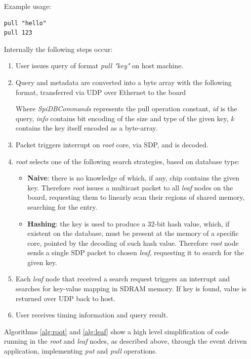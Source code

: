 Example usage:
\begin{lstlisting}
pull "hello"
pull 123
\end{lstlisting}

Internally the following steps occur:
\begin{enumerate}
\item User issues query of format \textit{pull "key"} on host machine.
\item Query and metadata are converted into a byte array with the following format, transferred via UDP over Ethernet to the board %

Where \textit{SpiDBCommands} represents the pull operation constant, \textit{id} is the query, \textit{info} contains bit encoding of the size and type of the given key, \textit{k} contains the key itself encoded as a byte-array.
\item Packet triggers interrupt on \textit{root} core, via SDP, and is decoded.
\item \textit{root} selects one of the following search strategies, based on database type:
\begin{itemize}
	\item \textbf{Naive}: there is no knowledge of which, if any, chip contains the given key. Therefore \textit{root} issues a multicast packet to all \textit{leaf} nodes on the board, requesting them to linearly scan their regions of shared memory, searching for the entry.
	\item \textbf{Hashing}: the key is used to produce a 32-bit hash value, which, if existent on the database, must be present at the memory of a specific core, pointed by the decoding of such hash value. Therefore \textit{root} node sends a single SDP packet to chosen \textit{leaf}, requesting it to search for the given key.
\end{itemize}
\item Each \textit{leaf} node that received a search request triggers an interrupt and searches for key-value mapping in SDRAM memory. If key is found, value is returned over UDP back to host.
\item User receives timing information and query result.
\end{enumerate}

Algorithms \ref{alg:root} and \ref{alg:leaf} show a high level simplification of code running in the \textit{root} and \textit{leaf} nodes, as described above, through the event driven application, implementing \textit{put} and \textit{pull} operations.


